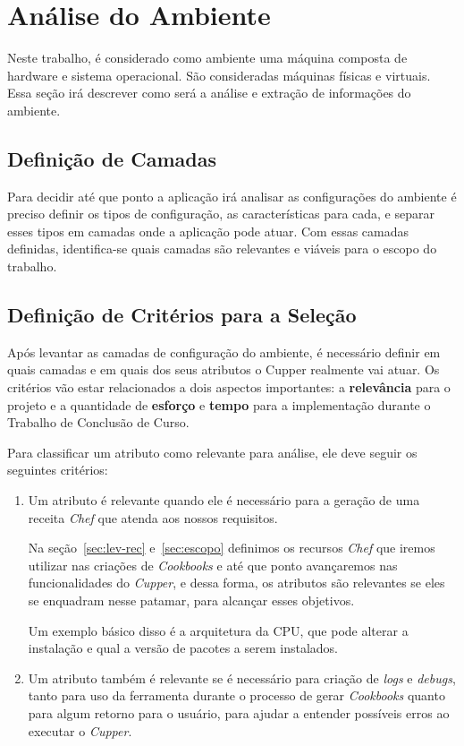 \section{Análise do Ambiente}

Neste trabalho, é considerado como ambiente uma máquina composta
de hardware e sistema operacional. São consideradas máquinas físicas
e virtuais. Essa seção irá descrever como será a análise e extração
de informações do ambiente.

\subsection{Definição de Camadas}

Para decidir até que ponto a aplicação irá analisar as configurações
do ambiente é preciso definir os tipos de configuração, as características para
cada, e separar esses tipos em camadas onde a aplicação pode atuar.
Com essas camadas definidas, identifica-se quais camadas são relevantes e viáveis
para o escopo do trabalho.


\subsection{Definição de Critérios para a Seleção}
\label{sec:defcritcamada}
Após levantar as camadas de configuração do ambiente, é necessário definir em
quais camadas e em quais dos seus atributos o Cupper realmente vai atuar. 
Os critérios vão estar relacionados a dois aspectos importantes: a \textbf{relevância} 
para o projeto e a quantidade de \textbf{esforço} e \textbf{tempo} para a implementação durante
o Trabalho de Conclusão de Curso.

Para classificar um atributo como relevante para análise, ele deve seguir os
seguintes critérios:

\begin{enumerate}
\item Um atributo é relevante quando ele é necessário para a geração de uma
receita \textit{Chef} que atenda aos nossos requisitos. 

Na seção~\ref{sec:lev-rec} e~\ref{sec:escopo} definimos os recursos \textit{Chef}
que iremos utilizar nas criações de \textit{Cookbooks} e até que ponto 
avançaremos nas funcionalidades do \textit{Cupper}, e dessa forma, os atributos
são relevantes se eles se enquadram nesse patamar, para alcançar esses objetivos.

Um exemplo básico disso é a arquitetura da CPU, que pode alterar a instalação
e qual a versão de pacotes a serem instalados.

\item Um atributo também é relevante se é necessário para criação de \textit{logs} 
e \textit{debugs}, tanto para uso da ferramenta durante o processo de gerar 
\textit{Cookbooks} quanto para algum retorno para o usuário, para ajudar 
a entender possíveis erros ao executar
o \textit{Cupper}.
\end{enumerate}

